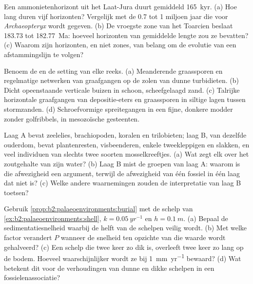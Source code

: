 \begin{exercise}[$\star$]\label{exo:b2:palaeoenvironments:2}
Een ammonietenhorizont uit het Laat-Jura duurt gemiddeld \qty{165}{kyr}. (a) Hoe lang duren vijf horizonten?
Vergelijk met de 0.7 tot 1 miljoen jaar die voor \emph{Archaeopteryx} wordt gegeven. (b) De vroegste
zone van het Toarcien beslaat 183.73 tot \qty{182.77}{Ma}: hoeveel horizonten van gemiddelde lengte zou ze bevatten?
(c) Waarom zijn horizonten, en niet zones, van belang om de evolutie van een afstammingslijn te volgen?
\end{exercise}

\begin{exercise}[$\star$]\label{exo:b2:palaeoenvironments:3}
Benoem de  en de setting van elke reeks. (a) Meanderende graassporen en regelmatige
netwerken van graafgangen op de zolen van dunne turbidieten. (b) Dicht opeenstaande verticale buizen in schoon,
scheefgelaagd zand. (c) Talrijke horizontale graafgangen van depositie-eters en graassporen in siltige
lagen tussen stormzanden. (d) Schroefvormige spreitegangen in een fijne, donkere modder zonder
golfribbels, in mesozoïsche gesteenten.
\end{exercise}

\begin{exercise}[$\star$]\label{exo:b2:palaeoenvironments:4}
Laag A bevat zeelelies, brachiopoden, koralen en trilobieten; laag B, van dezelfde ouderdom, bevat
plantenresten, visbeenderen, enkele tweekleppigen en slakken, en veel individuen van slechts twee soorten
mosselkreeftjes. (a) Wat zegt elk over het zoutgehalte van zijn water? (b) Laag B mist de groepen van
laag A: waarom is die afwezigheid een argument, terwijl de afwezigheid van één fossiel in één laag dat niet is?
(c) Welke andere waarnemingen zouden de interpretatie van laag B toetsen?
\end{exercise}

\begin{exercise}[$\star\star$]\label{exo:b2:palaeoenvironments:5}
Gebruik \cref{prop:b2:palaeoenvironments:burial} met de schelp van
\cref{ex:b2:palaeoenvironments:shell}, $k = \qty{0.05}{yr^{-1}}$ en $h = \qty{0.1}{m}$. (a)
Bepaal de sedimentatiesnelheid waarbij de helft van de schelpen veilig wordt. (b) Met welke factor verandert $P$
wanneer de snelheid ten opzichte van die waarde wordt gehalveerd? (c) Een schelp die twee keer zo dik is, overleeft twee keer zo lang
op de bodem. Hoeveel waarschijnlijker wordt ze bij \qty{1}{mm.yr^{-1}} bewaard? (d) Wat betekent
dit voor de verhoudingen van dunne en dikke schelpen in een fossielenassociatie?
\end{exercise}

